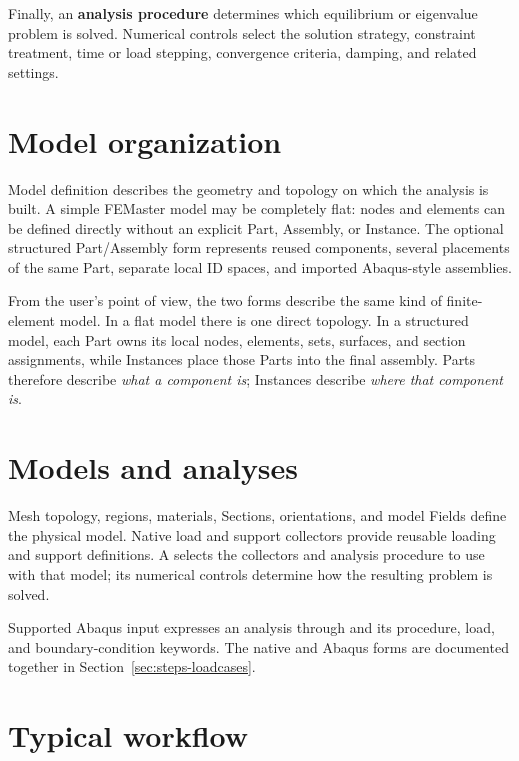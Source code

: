 Finally, an \textbf{analysis procedure} determines which equilibrium or eigenvalue problem is solved. Numerical controls select the solution strategy, constraint treatment, time or load stepping, convergence criteria, damping, and related settings.

\section{Model organization}

Model definition describes the geometry and topology on which the analysis is built. A simple FEMaster model may be completely flat: nodes and elements can be defined directly without an explicit Part, Assembly, or Instance. The optional structured Part/Assembly form represents reused components, several placements of the same Part, separate local ID spaces, and imported Abaqus-style assemblies.

From the user's point of view, the two forms describe the same kind of finite-element model. In a flat model there is one direct topology. In a structured model, each Part owns its local nodes, elements, sets, surfaces, and section assignments, while Instances place those Parts into the final assembly. Parts therefore describe \emph{what a component is}; Instances describe \emph{where that component is}.

\section{Models and analyses}

Mesh topology, regions, materials, Sections, orientations, and model Fields define the physical model. Native load and support collectors provide reusable loading and support definitions. A  selects the collectors and analysis procedure to use with that model; its numerical controls determine how the resulting problem is solved.

Supported Abaqus input expresses an analysis through  and its procedure, load, and boundary-condition keywords. The native and Abaqus forms are documented together in Section~\ref{sec:steps-loadcases}.

\section{Typical workflow}

